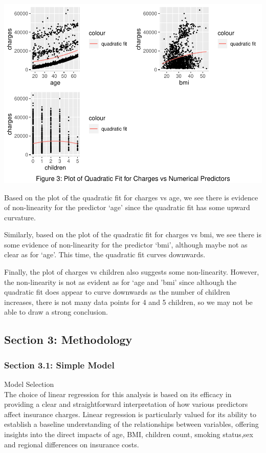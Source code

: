 \documentclass[
  12pt,
]{article}
\begin{document}
\includegraphics{finalproject_files/figure-latex/unnamed-chunk-16-1.pdf}

Based on the plot of the quadratic fit for charges vs age, we see there
is evidence of non-linearity for the predictor `age' since the quadratic
fit has some upward curvature.

Similarly, based on the plot of the quadratic fit for charges vs bmi, we
see there is some evidence of non-linearity for the predictor `bmi',
although maybe not as clear as for `age'. This time, the quadratic fit
curves downwards.

Finally, the plot of charges vs children also suggests some
non-linearity. However, the non-linearity is not as evident as for `age
and 'bmi' since although the quadratic fit does appear to curve
downwards as the number of children increases, there is not many data
points for 4 and 5 children, so we may not be able to draw a strong
conclusion.

\newpage

\subsection{Section 3: Methodology}\label{section-3-methodology}

\subsubsection{Section 3.1: Simple
Model}\label{section-3.1-simple-model}

Model Selection\\
The choice of linear regression for this analysis is based on its
efficacy in providing a clear and straightforward interpretation of how
various predictors affect insurance charges. Linear regression is
particularly valued for its ability to establish a baseline
understanding of the relationships between variables, offering insights
into the direct impacts of age, BMI, children count, smoking status,sex
and regional differences on insurance costs.
\end{document}
